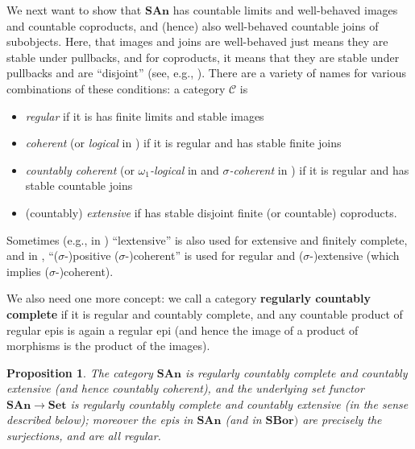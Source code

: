 \documentclass[11pt]{amsart}
\newcommand\cC{\mathcal{C}}
\newcommand\defword[1]{\textbf{#1}}
\newcommand\SAn{\mathbf{SAn}}
\newcommand\SBor{\mathbf{SBor}}
\newcommand\Set{\mathbf{Set}}
\theoremstyle{definition}
\theoremstyle{remark}
\theoremstyle{plain}
\newtheorem{propn}[defn]{Proposition}
\begin{document}
We next want to show that \( \SAn \) has countable limits and well-behaved images and countable coproducts, and (hence) also well-behaved countable joins of subobjects.
Here, that images and joins are well-behaved just means they are stable under pullbacks, and for coproducts, it means that they are stable under pullbacks and are ``disjoint'' (see, e.g., \cite{chen-universal-characterization-of-standard-borel}).
There are a variety of names for various combinations of these conditions: a category \( \cC \) is
\begin{itemize}
\item \emph{regular} if it is has finite limits and stable images
\item \emph{coherent} (or \emph{logical} in \cite{makkai-reyes-focl}) if it is regular and has stable finite joins
\item \emph{countably coherent} (or \emph{\( \omega_1 \)-logical} in \cite{makkai-reyes-focl} and \emph{\( \sigma \)-coherent} in \cite{johnstone-elephant-vols}) if it is regular and has stable countable joins
\item (countably) \emph{extensive} if has stable disjoint finite (or countable) coproducts.
\end{itemize}
Sometimes (e.g., in \cite{roberts-internal-cats-ana-loca}) ``lextensive'' is also used for extensive and finitely complete, and in \cite{johnstone-elephant-vols}, ``(\( \sigma \)-)positive (\( \sigma \)-)coherent'' is used for regular and (\( \sigma \)-)extensive (which implies (\( \sigma \)-)coherent).

We also need one more concept: we call a category \defword{regularly countably complete} if it is regular and countably complete, and any countable product of regular epis is again a regular epi (and hence the image of a product of morphisms is the product of the images).

\begin{propn} \label{propn:san-is-good}
  The category \( \SAn \) is regularly countably complete and countably extensive (and hence countably coherent), and the underlying set functor \( \SAn \to \Set \) is regularly countably complete and countably extensive (in the sense described below); moreover the epis in \( \SAn \) (and in \( \SBor) \) are precisely the surjections, and are all regular.
\end{propn}
\end{document}
